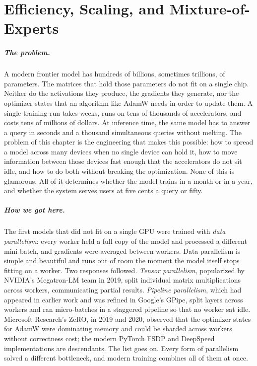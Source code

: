 \chapter{Efficiency, Scaling, and Mixture-of-Experts}
\label{chap:efficiency}
\label{sec:ch7-moe}

\scenelabel
\begin{scenestrip}
\end{scenestrip}

\paragraph{The problem.}
A modern frontier model has hundreds of billions, sometimes trillions,
of parameters. The matrices that hold those parameters do not fit on
a single chip. Neither do the activations they produce, the gradients
they generate, nor the optimizer states that an algorithm like AdamW
needs in order to update them. A single training run takes weeks,
runs on tens of thousands of accelerators, and costs tens of millions
of dollars. At inference time, the same model has to answer a query
in seconds and a thousand simultaneous queries without melting. The
problem of this chapter is the engineering that makes this possible:
how to spread a model across many devices when no single device can
hold it, how to move information between those devices fast enough
that the accelerators do not sit idle, and how to do both without
breaking the optimization. None of this is glamorous. All of it
determines whether the model trains in a month or in a year, and
whether the system serves users at five cents a query or fifty.

\paragraph{How we got here.}
The first models that did not fit on a single GPU were trained with
\emph{data parallelism}: every worker held a full copy of the model
and processed a different mini-batch, and gradients were averaged
between workers. Data parallelism is simple and beautiful and runs
out of room the moment the model itself stops fitting on a worker.
Two responses followed. \emph{Tensor parallelism}, popularized by
NVIDIA's Megatron-LM team in 2019, split individual matrix
multiplications across workers, communicating partial results.
\emph{Pipeline parallelism}, which had appeared in earlier work and
was refined in Google's GPipe, split layers across workers and ran
micro-batches in a staggered pipeline so that no worker sat idle.
Microsoft Research's ZeRO, in 2019 and 2020, observed that the
optimizer states for AdamW were dominating memory and could be
sharded across workers without correctness cost; the modern PyTorch
FSDP and DeepSpeed implementations are descendants. The list goes on.
Every form of parallelism solved a different bottleneck, and modern
training combines all of them at once.

